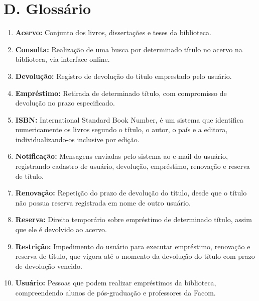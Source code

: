 \documentclass[a4paper]{article}
\begin{document}
	\section*{D. Glossário}
	\begin{enumerate}
		\item \textbf{Acervo:} Conjunto dos livros, dissertações e teses da biblioteca.
		\item \textbf{Consulta:} Realização de uma busca por determinado título no acervo na biblioteca, via interface online.
		\item \textbf{Devolução:} Registro de devolução do título emprestado pelo usuário.
		\item \textbf{Empréstimo:} Retirada de determinado título, com compromisso de devolução no prazo especificado.
		\item \textbf{ISBN:} International Standard Book Number, é um sistema que identifica numericamente os livros segundo o título, o autor, o país e a editora, individualizando-os inclusive por edição.
		\item \textbf{Notificação:} Mensagens enviadas pelo sistema ao e-mail do usuário, registrando cadastro de usuário, devolução, empréstimo, renovação e reserva de título.
		\item \textbf{Renovação:} Repetição do prazo de devolução do título, desde que o título não possua reserva registrada em nome de outro usuário.
		\item \textbf{Reserva:} Direito temporário sobre empréstimo de determinado título, assim que ele é devolvido ao acervo.
		\item \textbf{Restrição:} Impedimento do usuário para executar empréstimo, renovação e reserva de título, que vigora até o momento da devolução do título com prazo de devolução vencido.
		\item \textbf{Usuário:} Pessoas que podem realizar empréstimos da biblioteca, compreendendo alunos de pós-graduação e professores da Facom.
	\end{enumerate}
\end{document}
